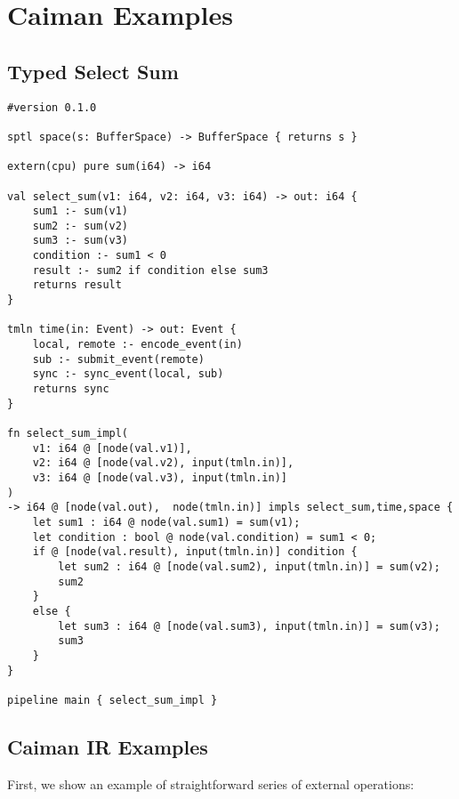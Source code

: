 \section{Caiman Examples}

\subsection{Typed Select Sum}
\label{subsec:typed-select-sum}

\begin{lstlisting}
#version 0.1.0

sptl space(s: BufferSpace) -> BufferSpace { returns s }

extern(cpu) pure sum(i64) -> i64

val select_sum(v1: i64, v2: i64, v3: i64) -> out: i64 {
    sum1 :- sum(v1)
    sum2 :- sum(v2)
    sum3 :- sum(v3)
    condition :- sum1 < 0
    result :- sum2 if condition else sum3
    returns result
}

tmln time(in: Event) -> out: Event { 
    local, remote :- encode_event(in)
    sub :- submit_event(remote)
    sync :- sync_event(local, sub)
    returns sync
}

fn select_sum_impl(
    v1: i64 @ [node(val.v1)], 
    v2: i64 @ [node(val.v2), input(tmln.in)], 
    v3: i64 @ [node(val.v3), input(tmln.in)]
) 
-> i64 @ [node(val.out),  node(tmln.in)] impls select_sum,time,space {
    let sum1 : i64 @ node(val.sum1) = sum(v1);
    let condition : bool @ node(val.condition) = sum1 < 0;
    if @ [node(val.result), input(tmln.in)] condition {
        let sum2 : i64 @ [node(val.sum2), input(tmln.in)] = sum(v2);
        sum2
    }
    else {
        let sum3 : i64 @ [node(val.sum3), input(tmln.in)] = sum(v3);
        sum3
    }
}

pipeline main { select_sum_impl }
\end{lstlisting}

\subsection{Caiman IR Examples}
\label{subsec:caiman-ir-examples}

First, we show an example of straightforward series of external operations:

